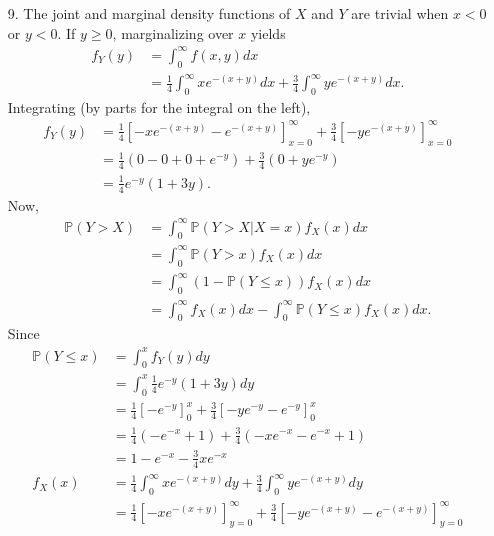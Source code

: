 \documentclass[a4paper,12pt]{article}
\begin{document}
\begin{enumerate}
    \item[9.] 
        The joint and marginal density functions of $X$ and $Y$ are trivial when $x < 0$ or $y < 0$. If $y \geq 0$, marginalizing over $x$ yields
        \begin{align*}
            f_Y(y) &= \int_0^\infty f(x, y) dx \\
            &= \frac{1}{4} \int_0^\infty xe^{-(x + y)}dx + \frac{3}{4} \int_0^\infty ye^{-(x + y)}dx.
        \end{align*}
        Integrating (by parts for the integral on the left),
        \begin{align*}
            f_Y(y) &= \frac{1}{4} \left[ -xe^{-(x + y)} - e^{-(x + y)} \right]_{x = 0}^\infty + \frac{3}{4} \left[ -ye^{-(x + y)} \right]_{x = 0}^\infty \\
            &= \frac{1}{4} \left( 0 - 0 + 0 + e^{-y} \right) + \frac{3}{4} \left( 0 + ye^{-y} \right) \\
            &= \frac{1}{4} e^{-y} (1 + 3y).
        \end{align*}
        Now,
        \begin{align*}
            \mathbb{P}(Y > X) &= \int_0^\infty \mathbb{P}(Y > X | X = x) f_X(x) dx \\
            &= \int_0^\infty \mathbb{P}(Y > x) f_X(x) dx \\
            &= \int_0^\infty (1 - \mathbb{P}(Y \leq x)) f_X(x) dx \\
            &= \int_0^\infty f_X(x) dx - \int_0^\infty \mathbb{P}(Y \leq x) f_X(x) dx.
        \end{align*}
        Since
        \begin{align*}
            \mathbb{P}(Y \leq x) &= \int_0^x f_Y(y) dy \\
            &= \int_0^x \frac{1}{4} e^{-y} (1 + 3y) dy \\
            &= \frac{1}{4} \left[ -e^{-y} \right]_0^x + \frac{3}{4} \left[ -ye^{-y} - e^{-y} \right]_0^x \\
            &= \frac{1}{4} \left( -e^{-x} + 1 \right) + \frac{3}{4} \left( -xe^{-x} - e^{-x} + 1 \right) \\
            &= 1 - e^{-x} - \frac{3}{4}xe^{-x} \\
            f_X(x) &= \frac{1}{4} \int_0^\infty xe^{-(x + y)}dy + \frac{3}{4} \int_0^\infty ye^{-(x + y)}dy \\
            &= \frac{1}{4} \left[ -xe^{-(x + y)} \right]_{y = 0}^\infty + \frac{3}{4} \left[ -ye^{-(x + y)} - e^{-(x + y)} \right]_{y = 0}^\infty \\

\end{align*}
\end{enumerate}
\end{document}
